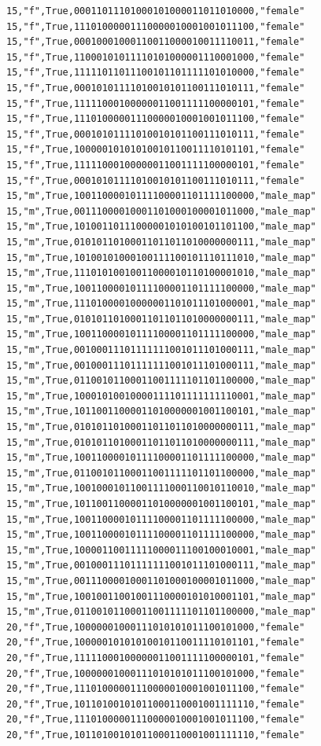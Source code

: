 \documentclass[authoryearcitations]{UoYCSproject}
\begin{document}
\begin{framed}
\begin{verbatim}
15,"f",True,00011011101000101000011011010000,"female"
15,"f",True,11101000001110000010001001011100,"female"
15,"f",True,00010001000110011000010011110011,"female"
15,"f",True,11000101011110101000001110001000,"female"
15,"f",True,11111011011100101101111101010000,"female"
15,"f",True,00010101111010010101100111010111,"female"
15,"f",True,11111000100000011001111100000101,"female"
15,"f",True,11101000001110000010001001011100,"female"
15,"f",True,00010101111010010101100111010111,"female"
15,"f",True,10000010101010010110011110101101,"female"
15,"f",True,11111000100000011001111100000101,"female"
15,"f",True,00010101111010010101100111010111,"female"
15,"m",True,10011000010111100001101111100000,"male_map"
15,"m",True,00111000010001101000100001011000,"male_map"
15,"m",True,10100110111000001010100101101100,"male_map"
15,"m",True,01010110100011011011010000000111,"male_map"
15,"m",True,10100101000100111100101110111010,"male_map"
15,"m",True,11101010010011000010110100001010,"male_map"
15,"m",True,10011000010111100001101111100000,"male_map"
15,"m",True,11101000010000001101011101000001,"male_map"
15,"m",True,01010110100011011011010000000111,"male_map"
15,"m",True,10011000010111100001101111100000,"male_map"
15,"m",True,00100011101111111001011101000111,"male_map"
15,"m",True,00100011101111111001011101000111,"male_map"
15,"m",True,01100101100011001111101101100000,"male_map"
15,"m",True,10001010010000111101111111110001,"male_map"
15,"m",True,10110011000011010000001001100101,"male_map"
15,"m",True,01010110100011011011010000000111,"male_map"
15,"m",True,01010110100011011011010000000111,"male_map"
15,"m",True,10011000010111100001101111100000,"male_map"
15,"m",True,01100101100011001111101101100000,"male_map"
15,"m",True,10010001011001111000110010110010,"male_map"
15,"m",True,10110011000011010000001001100101,"male_map"
15,"m",True,10011000010111100001101111100000,"male_map"
15,"m",True,10011000010111100001101111100000,"male_map"
15,"m",True,10000110011111000011100100010001,"male_map"
15,"m",True,00100011101111111001011101000111,"male_map"
15,"m",True,00111000010001101000100001011000,"male_map"
15,"m",True,10010011001001110000101010001101,"male_map"
15,"m",True,01100101100011001111101101100000,"male_map"
20,"f",True,10000001000111010101011100101000,"female"
20,"f",True,10000010101010010110011110101101,"female"
20,"f",True,11111000100000011001111100000101,"female"
20,"f",True,10000001000111010101011100101000,"female"
20,"f",True,11101000001110000010001001011100,"female"
20,"f",True,10110100101011000110001001111110,"female"
20,"f",True,11101000001110000010001001011100,"female"
20,"f",True,10110100101011000110001001111110,"female"

\end{verbatim}
\end{framed}
\end{document}
